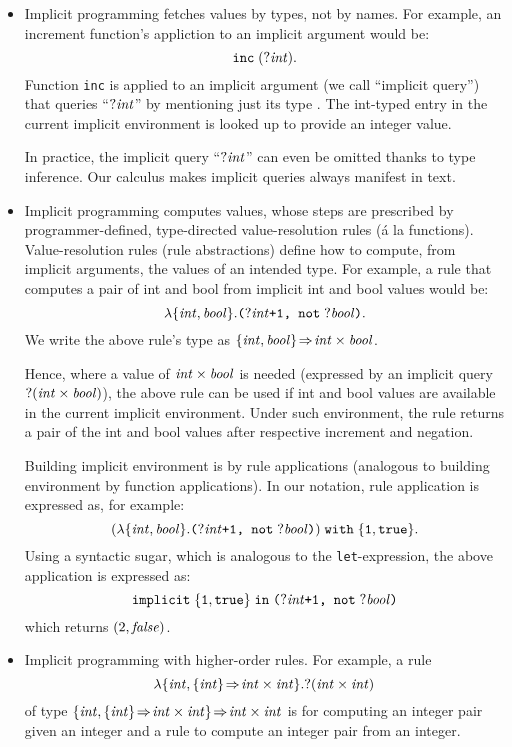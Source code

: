 \begin{itemize}
\item {Implicit programming} fetches values by types, not by names.
  For example, an increment function's appliction to an implicit
  argument would be:
\[
\texttt{inc}\; ({\it ?\/}{\it int\/}).
\]
Function \texttt{inc} is applied to an implicit argument (we call ``implicit
query'') that queries ``${\it ?\/}{\it int\/}$'' by mentioning just its
type \tyInt.  The int-typed entry in the current implicit
environment is looked up  to provide an integer value. 

In practice, the implicit query ``${\it ?\/}{\it int\/}$'' can even be
omitted thanks to type inference. Our calculus makes implicit queries
always manifest in text. 

\item Implicit programming computes values, whose steps are prescribed
  by programmer-defined, type-directed value-resolution rules  (\'{a}
  la functions). Value-resolution rules (rule abstractions) define how
  to compute, from implicit arguments, the values of an intended
  type. For example, a rule that computes a pair of int and bool from
  implicit int and bool values would be:
\[
\lambda\{{\it int\/}, {\it bool\/}\}.\texttt{(\ensuremath{{\it ?\/}{\it int\/}}+1, not\;\ensuremath{{\it ?\/}{\it bool\/}})}.
\]
We write the above rule's type as
$\{{\it int\/},{\it bool\/}\}\!\Rightarrow\!{\it int\/}\times{\it bool\/}$. 

Hence, where a value of ${\it int\/}\times{\it bool\/}$ is needed (expressed by 
an implicit query ${\it ?\/}({\it int\/}\times{\it bool\/})$), 
the above rule can be used if int and bool
values are available in the current implicit environment. Under such
environment, the rule returns a pair of the int and bool values after 
respective increment and negation. 

Building implicit environment is by rule applications
(analogous to building environment by function applications).
In our notation, rule application is expressed as, for example:
\[
(\lambda\{{\it int\/}, {\it bool\/}\}.\texttt{(\ensuremath{{\it ?\/}{\it int\/}}+1, not\;\ensuremath{{\it ?\/}{\it bool\/}})}
     )\;\texttt{with}\;\{\texttt{1},\texttt{true}\}.
\]
Using a syntactic sugar, which is analogous to the \texttt{let}-expression, the
above application is expressed as:
\[
\texttt{implicit}\;\{\texttt{1},\texttt{true}\}\;\texttt{in}\;\texttt{(\ensuremath{{\it ?\/}{\it int\/}}+1, not\;\ensuremath{{\it ?\/}{\it bool\/}})}
\]
which returns $(2,{\it false\/})$. 

\item Implicit programming with higher-order rules. For example, a rule
\[
\lambda\{{\it int\/},\{{\it int\/}\}\!\Rightarrow\!{\it int\/}\times{\it int\/}\}.{\it ?\/}({\it int\/}\times{\it int\/})
\]
of type
$\{{\it int\/},\{{\it int\/}\}\!\Rightarrow\!{\it int\/}\times{\it int\/}\}\!\Rightarrow\!{\it int\/}\times{\it int\/}$ 
is for computing an integer pair given an integer and a rule to
compute an integer pair from an integer.


\end{itemize}
